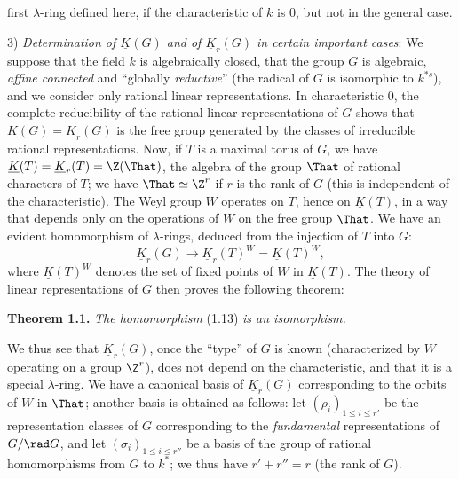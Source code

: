 %
first $\lambda$-ring defined here, if the characteristic of $k$ is $0$, but not in the general case.

3) \emph{Determination of $\underline{K}(G)$ and of $\underline{K}_r(G)$ in certain important cases}: We suppose that the field $k$ is algebraically closed, that the group $G$ is algebraic, \emph{affine connected} and ``globally \emph{reductive}'' (the radical of $G$ is isomorphic to $k^{*s}$), and we consider only rational linear representations. In characteristic $0$, the complete reducibility of the rational linear representations of $G$ shows that $\underline{K}(G)=\underline{K}_r(G)$ is the free group generated by the classes of irreducible rational representations. Now, if $T$ is a maximal torus of $G$, we have $\underline{K}(T)=\underline{K}_r(T)=\Z(\That)$, the algebra of the group $\That$ of rational characters of $T$; we have $\That\simeq\Z^r$ if $r$ is the rank of $G$ (this is independent of the characteristic). The Weyl group $W$ operates on $T$, hence on $\underline{K}(T)$, in a way that depends only on the operations of $W$ on the free group $\That$. We have an evident homomorphism of $\lambda$-rings, deduced from the injection of $T$ into $G$:
\begin{equation}\tag{1.13}
\underline{K}_r(G)\longrightarrow \underline{K}_r(T)^W=\underline{K}(T)^W,
\end{equation}
where $\underline{K}(T)^W$ denotes the set of fixed points of $W$ in $\underline{K}(T)$. The theory of linear representations of $G$ then proves the following theorem:

\textbf{Theorem 1.1.} \emph{The homomorphism} (1.13) \emph{is an isomorphism.}

We thus see that $\underline{K}_r(G)$, once the ``type'' of $G$ is known (characterized by $W$ operating on a group $\Z^r$), does not depend on the characteristic, and that it is a special $\lambda$-ring. We have a canonical basis of $\underline{K}_r(G)$ corresponding to the orbits of $W$ in $\That$; another basis is obtained as follows:
%
let $(\rho_i)_{1\leq i\leq r'}$ be the representation classes of $G$ corresponding to the \emph{fundamental} representations of $G/\rad G$, and let $(\sigma_i)_{1\leq i\leq r''}$ be a basis of the group of rational homomorphisms from $G$ to $k^*$; we thus have $r'+r''=r$ (the rank of $G$).

